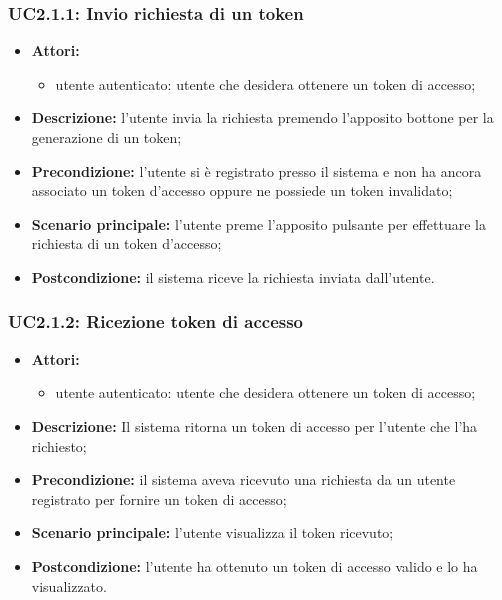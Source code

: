 \subsubsection{UC2.1.1: Invio richiesta di un token}
\begin{itemize}
	\item \textbf{Attori:}
	\begin{itemize}
		\item utente autenticato: utente che desidera ottenere un token di accesso;
	\end{itemize}
	\item \textbf{Descrizione:} l'utente invia la richiesta premendo l'apposito bottone per la generazione di un token;
	\item \textbf{Precondizione:} l'utente si è registrato presso il sistema e non ha ancora associato un token d'accesso oppure ne possiede un token invalidato;
	\item \textbf{Scenario principale:} l'utente preme l'apposito pulsante per effettuare la richiesta di un token d'accesso;
	\item \textbf{Postcondizione:} il sistema riceve la richiesta inviata dall'utente.
\end{itemize}

\subsubsection{UC2.1.2: Ricezione token di accesso}
\begin{itemize}
	\item \textbf{Attori:}
	\begin{itemize}
		\item utente autenticato: utente che desidera ottenere un token di accesso;
	\end{itemize}
	\item \textbf{Descrizione:} Il sistema ritorna un token di accesso per l'utente che l'ha richiesto;
	\item \textbf{Precondizione:} il sistema aveva ricevuto una richiesta da un utente registrato per fornire un token di accesso;
	\item \textbf{Scenario principale:} l'utente visualizza il token ricevuto;
	\item \textbf{Postcondizione:} l'utente ha ottenuto un token di accesso valido e lo ha visualizzato.
\end{itemize}

\pagebreak


